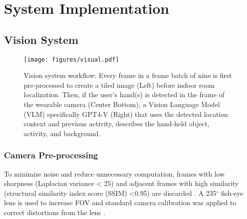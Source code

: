 

\section{System Implementation}\label{systemimp}
\subsection{Vision System}

\begin{figure*}
    \centering
    \texttt{[image: figures/visual.pdf]}
    \caption{Vision system workflow: Every frame in a frame batch of nine is first pre-processed to create a tiled image (Left) before indoor room localization. Then, if the user's hand(s) is detected in the frame of the wearable camera (Center Bottom), a Vision Language Model (VLM) specifically GPT4-V (Right) that uses the detected location context and previous activity, describes the hand-held object, activity, and background.}
    \label{fig:visual}
\end{figure*}


\subsubsection{Camera Pre-processing}
 To minimize noise and reduce unnecessary computation, frames with low sharpness (Laplacian variance < 25) and adjacent frames with high similarity (structural similarity index score (SSIM) <0.95) are discarded \cite{ssim}. A 235$^{\circ}$ fish-eye lens is used to increase FOV and standard camera calibration was applied to correct distortions from the lens \cite{opencv_calibration}.

